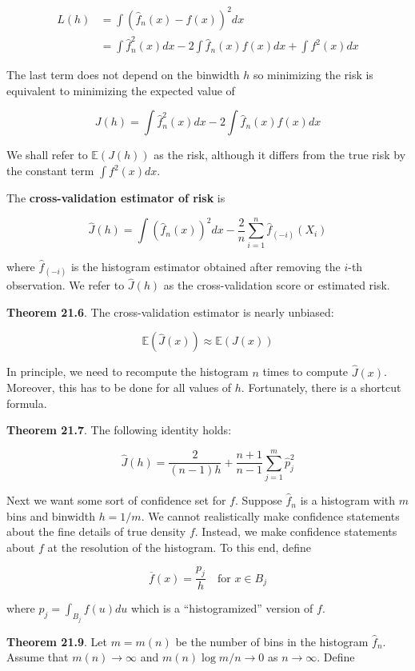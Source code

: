 \begin{align*}
L(h) &= \int \left( \hat{f}_{n}(x) - f(x) \right)^{2} dx \\
&= \int \hat{f}_{n}^{2}(x) dx - 2 \int \hat{f}_{n}(x) f(x) dx + \int f^{2}(x) dx
\end{align*}

The last term does not depend on the binwidth \(h\) so minimizing the
risk is equivalent to minimizing the expected value of

\[ J(h) = \int \hat{f}_{n}^{2}(x) dx - 2 \int \hat{f}_{n}(x) f(x) dx \]

We shall refer to \(\mathbb{E}(J(h))\) as the risk, although it differs
from the true risk by the constant term \(\int f^{2}(x) dx\).

The \textbf{cross-validation estimator of risk} is

\[ \hat{J}(h) = \int \left( \hat{f}_{n}(x) \right)^{2} dx - \frac{2}{n} \sum_{i=1}^{n} \hat{f}_{(-i)}(X_{i})\]

where \(\hat{f}_{(-i)}\) is the histogram estimator obtained after
removing the \(i\)-th observation. We refer to \(\hat{J}(h)\) as the
cross-validation score or estimated risk.

\textbf{Theorem 21.6}. The cross-validation estimator is nearly
unbiased:

\[ \mathbb{E}(\hat{J}(x)) \approx \mathbb{E}(J(x)) \]

In principle, we need to recompute the histogram \(n\) times to compute
\(\hat{J}(x)\). Moreover, this has to be done for all values of \(h\).
Fortunately, there is a shortcut formula.

\textbf{Theorem 21.7}. The following identity holds:

\[ \hat{J}(h) = \frac{2}{(n - 1)h} + \frac{n+1}{n-1} \sum_{j=1}^m \hat{p}_{j}^{2} \]

Next we want some sort of confidence set for \(f\). Suppose
\(\hat{f}_{n}\) is a histogram with \(m\) bins and binwidth \(h = 1 / m\).
We cannot realistically make confidence statements about the fine
details of true density \(f\). Instead, we make confidence statements
about \(f\) at the resolution of the histogram. To this end, define

\[ \overline{f}(x) = \frac{p_{j}}{h} \quad \text{for } x \in B_{j} \]

where \(p_{j} = \int_{B_{j}} f(u) du\) which is a ``histogramized'' version
of \(f\).

\textbf{Theorem 21.9}. Let \(m = m(n)\) be the number of bins in the
histogram \(\hat{f}_{n}\). Assume that \(m(n) \rightarrow \infty\) and
\(m(n) \log m / n \rightarrow 0\) as \(n \rightarrow \infty\). Define

